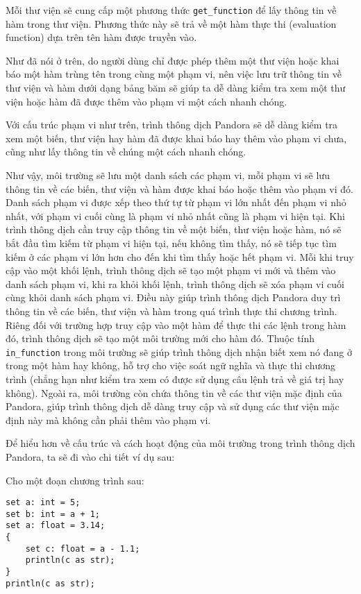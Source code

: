     Mỗi thư viện sẽ cung cấp một phương thức \texttt{get\_function} để lấy thông tin về hàm trong thư viện. Phương thức này sẽ trả về một hàm thực thi (evaluation function) dựa trên tên hàm được truyền vào.

    Như đã nói ở trên, do người dùng chỉ được phép thêm một thư viện hoặc khai báo một hàm trùng tên trong cùng một phạm vi, nên việc lưu trữ thông tin về thư viện và hàm dưới dạng bảng băm sẽ giúp ta dễ dàng kiểm tra xem một thư viện hoặc hàm đã được thêm vào phạm vi một cách nhanh chóng.

    Với cấu trúc phạm vi như trên, trình thông dịch Pandora sẽ dễ dàng kiểm tra xem một biến, thư viện hay hàm đã được khai báo hay thêm vào phạm vi chưa, cũng như lấy thông tin về chúng một cách nhanh chóng.

    Như vậy, môi trường sẽ lưu một danh sách các phạm vi, mỗi phạm vi sẽ lưu thông tin về các biến, thư viện và hàm được khai báo hoặc thêm vào phạm vi đó. Danh sách phạm vi được xếp theo thứ tự từ phạm vi lớn nhất đến phạm vi nhỏ nhất, với phạm vi cuối cùng là phạm vi nhỏ nhất cũng là phạm vi hiện tại. Khi trình thông dịch cần truy cập thông tin về một biến, thư viện hoặc hàm, nó sẽ bắt đầu tìm kiếm từ phạm vi hiện tại, nếu không tìm thấy, nó sẽ tiếp tục tìm kiếm ở các phạm vi lớn hơn cho đến khi tìm thấy hoặc hết phạm vi. Mỗi khi truy cập vào một khối lệnh, trình thông dịch sẽ tạo một phạm vi mới và thêm vào danh sách phạm vi, khi ra khỏi khối lệnh, trình thông dịch sẽ xóa phạm vi cuối cùng khỏi danh sách phạm vi. Điều này giúp trình thông dịch Pandora duy trì thông tin về các biến, thư viện và hàm trong quá trình thực thi chương trình. Riêng đối với trường hợp truy cập vào một hàm để thực thi các lệnh trong hàm đó, trình thông dịch sẽ tạo một môi trường mới cho hàm đó. Thuộc tính \texttt{in\_function} trong môi trường sẽ giúp trình thông dịch nhận biết xem nó đang ở trong một hàm hay không, hỗ trợ cho việc soát ngữ nghĩa và thực thi chương trình (chẳng hạn như kiểm tra xem có được sử dụng câu lệnh trả về giá trị hay không). Ngoài ra, môi trường còn chứa thông tin về các thư viện mặc định của Pandora, giúp trình thông dịch dễ dàng truy cập và sử dụng các thư viện mặc định này mà không cần phải thêm vào phạm vi.

    Để hiểu hơn về cấu trúc và cách hoạt động của môi trường trong trình thông dịch Pandora, ta sẽ đi vào chi tiết ví dụ sau:

\noindent Cho một đoạn chương trình sau:

\begin{lstlisting}[]
set a: int = 5;
set b: int = a + 1;
set a: float = 3.14;
{
    set c: float = a - 1.1;
    println(c as str);
}
println(c as str);


\end{lstlisting}

